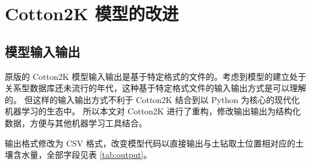 \chapter{Cotton2K 模型的改进}\label{chap:modelModification}

\section{模型输入输出}\label{sec:io}

原版的 Cotton2K 模型输入输出是基于特定格式的文件的。考虑到模型的建立处于关系型数据库还未流行的年代，这种基于特定格式文件的输入输出方式是可以理解的。
但这样的输入输出方式不利于 Cotton2K 结合到以 Python 为核心的现代化机器学习的生态中。
所以本文对 Cotton2K 进行了重构，修改输出输出为结构化数据，方便与其他机器学习工具结合。

输出格式修改为 CSV 格式，改变模型代码以直接输出与土钻取土位置相对应的土壤含水量，全部字段见表 \ref{tab:output}。

